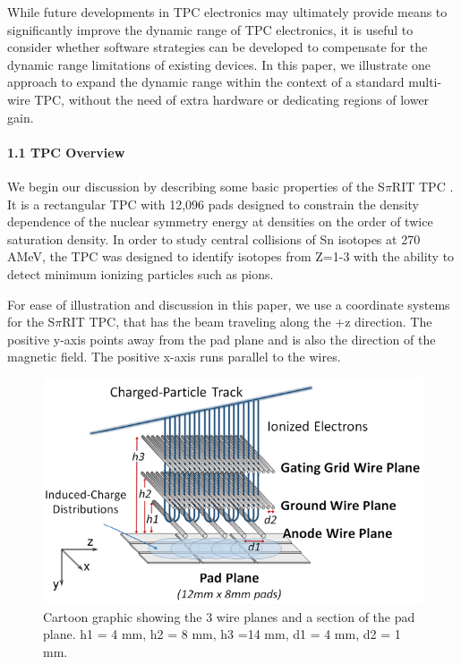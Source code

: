 \documentclass[review]{elsarticle}
\begin{document}
While future developments in TPC electronics may ultimately provide means to significantly improve the dynamic range of TPC electronics, it is useful to consider whether software strategies can be developed to compensate for the dynamic range limitations of existing devices. In this paper, we illustrate one approach to expand the dynamic range within the context of a standard multi-wire TPC, without the need of extra hardware or dedicating regions of lower gain.


\paragraph{1.1 TPC Overview}
We begin our discussion by describing some basic properties of the S$\pi$RIT TPC \citep{shane}. It is a rectangular TPC with 12,096 pads designed to constrain the density dependence of the nuclear symmetry energy at densities on the order of twice saturation density. In order to study central collisions of Sn isotopes at 270 AMeV, the TPC was designed to identify isotopes from Z=1-3 with the ability to detect minimum ionizing particles such as pions. 

For ease of illustration and discussion in this paper, we use a coordinate systems for the S$\pi$RIT TPC, that has the beam traveling along the +z direction. The positive y-axis points away from the pad plane and is also the direction of the magnetic field. The positive x-axis runs parallel to the wires. 

\begin{figure}[ht!]
\includegraphics[width=\linewidth]{padwire}
\caption{Cartoon graphic showing the 3 wire planes and a section of the pad plane. h1 = 4 mm, h2 = 8 mm, h3 =14 mm, d1 = 4 mm, d2 = 1 mm.}
\label{fig:padwire}
\end{figure}
\end{document}
